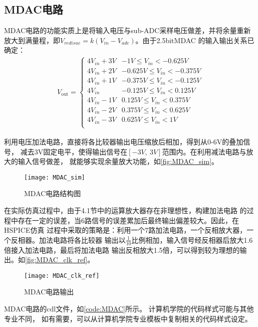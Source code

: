 \subsection{MDAC电路}
    MDAC电路的功能实质上是将输入电压与sub-ADC采样电压做差，并将余量重新
    放大到满量程，即$ V_{redisue} = k(V_{in} - V_{adc}) $。由于2.5bitMDAC
    的输入输出关系已确定：
    \begin{align}
        V_{\text {out}}=
        \left\{
        \begin{array}{ccc}
            4V_{in} + 3V & -1V \leq V_{in} < -0.625V \\
            4V_{in} + 2V & -0.625V \leq V_{in} < -0.375V \\
            4V_{in} + 1V & -0.375V \leq V_{in} < -0.125V \\
            4V_{in} & -0.125V \leq V_{in} < 0.125V \\
            4V_{in} - 1V & 0.125V \leq V_{in} < 0.375V \\
            4V_{in} - 2V & 0.375V \leq V_{in} < 0.625V \\
            4V_{in} - 3V & 0.625V \leq V_{in} < 1V \\
       \end{array}
        \right.
    \end{align}
    \par 利用电压加法电路，直接将各比较器输出电压缩放后相加，得到从0-6V的叠加信号，
    减去3V固定电平，使得输出信号在$[-3V,\ 3V]$范围内。在利用减法电路与放大的输入信号做差，
    就能够实现余量放大功能，如\autoref{fig:MDAC_sim}。
    \begin{figure}[ht]
        \centering
        \texttt{[image: MDAC\_sim]}
        \caption{\label{fig:MDAC_sim}MDAC电路结构图}
    \end{figure}
    \par 在实际仿真过程中，由于4.1节中的运算放大器存在非理想性，构建加法电路
    的过程中存在一定的误差，当6路信号的误差累加后最终输出偏差较大。因此，在HSPICE仿真
    过程中采取的策略是：利用一个7路加法电路，一个反相放大器，一个反相器。加法电路将各比较器
    输出以$ \frac{1}{10} $比例相加，输入信号经反相器后放大1.6倍接入加法电路，最后将加法电路
    输出反相放大1.5倍，可以得到较为理想的输出。如\autoref{fig:MDAC_clk_ref}。
    \begin{figure}[H]
        \centering
        \texttt{[image: MDAC\_clk\_ref]}
        \caption{\label{fig:MDAC_clk_ref}MDAC电路输出}
    \end{figure}

    \par MDAC电路的cdl文件，如\autoref{code:MDAC}所示。
    计算机学院的代码样式可能与其他专业不同，
    如有需要，可以从计算机学院专业模板中复制相关的代码样式设定。

